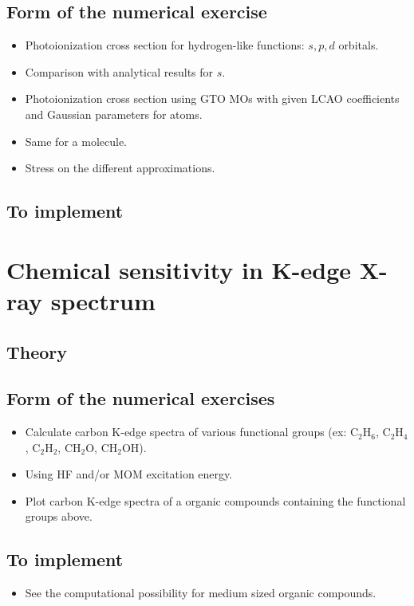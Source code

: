 \documentclass[12pt]{article}
\begin{document}
\subsection{Form of the numerical exercise}
\begin{itemize}
 \item Photoionization cross section for hydrogen-like functions: $s, p , d$ orbitals.
 \item Comparison with analytical results for $s$.
 \item Photoionization cross section using GTO MOs with given LCAO coefficients and Gaussian parameters for atoms. 
 \item Same for a molecule.
 \item Stress on the different approximations.
\end{itemize} 

\subsection{To implement}

\section{Chemical sensitivity in K-edge X-ray spectrum}

\subsection{Theory}

\subsection{Form of the numerical exercises}
\begin{itemize}
 \item Calculate carbon K-edge spectra of various functional groups (ex: C$_2$H$_6$, C$_2$H$_4$, C$_2$H$_2$, CH$_2$O, CH$_2$OH).
 \item Using HF and/or MOM excitation energy.
 \item Plot carbon K-edge spectra of a organic compounds containing the functional groups above. 
\end{itemize}

\subsection{To implement}
\begin{itemize}
 \item See the computational possibility for medium sized organic compounds.
\end{itemize}
\end{document}
